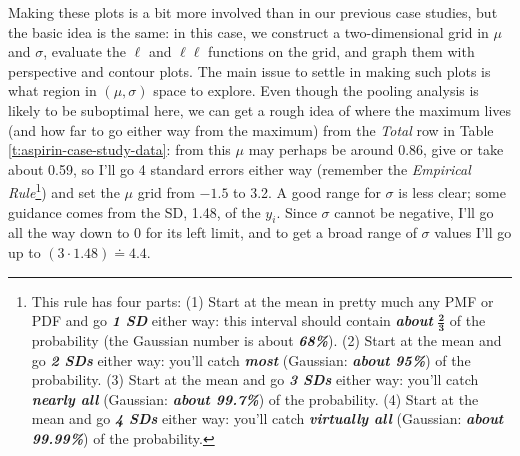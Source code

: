 \documentclass[12pt]{article}
\begin{document}
Making these plots is a bit more involved than in our previous case studies, but the basic idea is the same: in this case, we construct a two-dimensional grid in $\mu$ and $\sigma$, evaluate the $\ell$ and $\ell \ell$ functions on the grid, and graph them with perspective and contour plots. The main issue to settle in making such plots is what region in $( \mu, \sigma )$ space to explore. Even  though the pooling analysis is likely to be suboptimal here, we can get a rough idea of where the maximum lives (and how far to go either way from the maximum) from the \textit{Total} row in Table \ref{t:aspirin-case-study-data}: from this $\mu$ may perhaps be around 0.86, give or take about 0.59, so I'll go 4 standard errors either way (remember the \textit{Empirical Rule}\footnote{This rule has four parts: (1) Start at the mean in pretty much any PMF or PDF and go \textit{\textbf{1 SD}} either way: this interval should contain \textit{\textbf{about}} $\bm{ \frac{ 2 }{ 3 } }$ of the probability
(the Gaussian number is about \textit{\textbf{68\%}}). (2) Start at the mean and go \textit{\textbf{2 SDs}} either way: you'll catch \textbf{\textit{most}} (Gaussian: \textit{\textbf{about 95\%}}) of the probability. (3) Start at the mean and go \textit{\textbf{3 SDs}} either way: you'll catch \textbf{\textit{nearly all}} (Gaussian: \textit{\textbf{about 99.7\%}}) of the probability. (4) Start at the mean and go \textit{\textbf{4 SDs}} either way: you'll catch \textbf{\textit{virtually all}} (Gaussian: \textit{\textbf{about 99.99\%}}) of the probability.}) and set the $\mu$ grid from $-1.5$ to 3.2. A good range for $\sigma$ is less clear; some guidance comes from the SD, 1.48, of the $y_i$. Since $\sigma$ cannot be negative, I'll go all the way down to 0 for its left limit, and to get a broad range of $\sigma$ values I'll go up to $( 3 \cdot 1.48 ) \doteq 4.4$.
\end{document}
